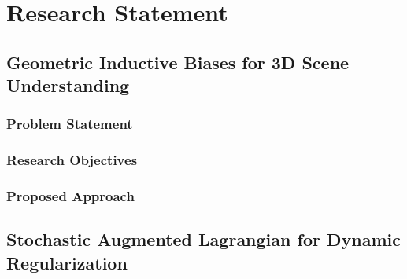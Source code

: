 
%

\chapter{Research Statement}\label{cha:statement}



\section{Geometric Inductive Biases for 3D Scene Understanding}

\subsection{Problem Statement}

\subsection{Research Objectives}

\subsection{Proposed Approach}






\section{Stochastic Augmented Lagrangian for Dynamic Regularization}

